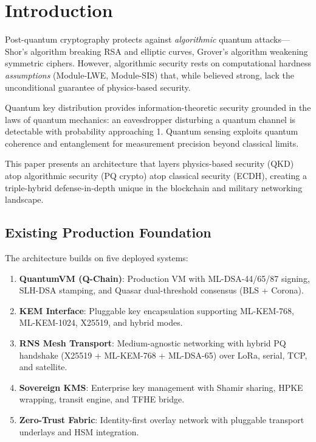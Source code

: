 \documentclass[11pt,letterpaper]{article}
\begin{document}
\tableofcontents
\newpage

\section{Introduction}

Post-quantum cryptography protects against \emph{algorithmic} quantum attacks---Shor's algorithm breaking RSA and elliptic curves, Grover's algorithm weakening symmetric ciphers. However, algorithmic security rests on computational hardness \emph{assumptions} (Module-LWE, Module-SIS) that, while believed strong, lack the unconditional guarantee of physics-based security.

Quantum key distribution provides information-theoretic security grounded in the laws of quantum mechanics: an eavesdropper disturbing a quantum channel is detectable with probability approaching 1. Quantum sensing exploits quantum coherence and entanglement for measurement precision beyond classical limits.

This paper presents an architecture that layers physics-based security (QKD) atop algorithmic security (PQ crypto) atop classical security (ECDH), creating a triple-hybrid defense-in-depth unique in the blockchain and military networking landscape.

\subsection{Existing Production Foundation}

The architecture builds on five deployed systems:

\begin{enumerate}
\item \textbf{QuantumVM (Q-Chain)}: Production VM with ML-DSA-44/65/87 signing, SLH-DSA stamping, and Quasar dual-threshold consensus (BLS + Corona).
\item \textbf{KEM Interface}: Pluggable key encapsulation supporting ML-KEM-768, ML-KEM-1024, X25519, and hybrid modes.
\item \textbf{RNS Mesh Transport}: Medium-agnostic networking with hybrid PQ handshake (X25519 + ML-KEM-768 + ML-DSA-65) over LoRa, serial, TCP, and satellite.
\item \textbf{Sovereign KMS}: Enterprise key management with Shamir sharing, HPKE wrapping, transit engine, and TFHE bridge.
\item \textbf{Zero-Trust Fabric}: Identity-first overlay network with pluggable transport underlays and HSM integration.
\end{enumerate}
\end{document}
